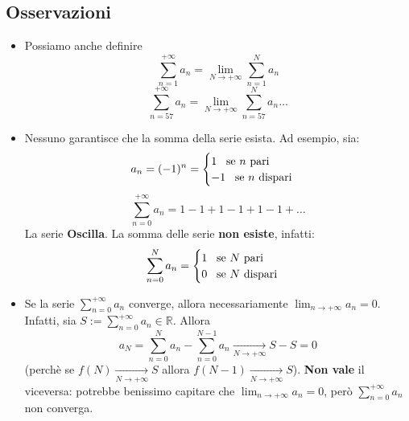 \documentclass[a4paper]{article}
\theoremstyle{break}
\theoremstyle{break}
\theoremstyle{break}
\theoremstyle{break}
\begin{document}
\subsection{Osservazioni}
\begin{itemize}
  \item Possiamo anche definire
    \[
      \sum_{n=1}^{+\infty} a_n = \lim_{N \to +\infty} \sum_{n=1}^{N} a_n
    \] 
    \[
      \sum_{n=57}^{+\infty} a_n = \lim_{N \to +\infty} \sum_{n=57}^{N} a_n \ldots
    \] 
  \item Nessuno garantisce che la somma della serie esista. Ad esempio, sia:
    \[
      a_n = (-1)^n = \begin{cases}
        1 \;\;\; \text{se \( n \) pari}\\
        -1 \;\;\; \text{se \( n \) dispari}
      \end{cases}
    \] 
    \[
      \sum_{n=0}^{+\infty} a_n = 1 - 1 + 1 - 1 + 1 - 1 + \ldots
    \] 
    La serie \textbf{Oscilla}. La somma delle serie \textbf{non esiste}, infatti:
    \[
      \sum_{n=0}^{N} a_n = \begin{cases}
        1 \;\;\; \text{se \( N \) pari}\\
        0 \;\;\; \text{se \( N \) dispari}
      \end{cases}
    \] 
  \item Se la serie \( \sum_{n=0}^{+\infty} a_n \) converge, allora necessariamente \( \lim_{n \to +\infty} a_n = 0 \).
    Infatti, sia \( S:= \sum_{n=0}^{+\infty} a_n \in \mathbb{R} \). Allora
    \[
      a_N = \sum_{n=0}^{N} a_n - \sum_{n=0}^{N-1} a_n \underset{N \to +\infty}{\to } S - S = 0
    \] 
    (perchè se \( f(N) \underset{N \to +\infty}{\to } S \) allora \( f(N-1) \underset{N \to +\infty}{\to } S \)).
    \textbf{Non vale} il viceversa: potrebbe benissimo capitare che \( \lim_{n \to +\infty} a_n = 0 \),
    però \( \sum_{n=0}^{+\infty} a_n \) non converga.
\end{itemize}
\end{document}
